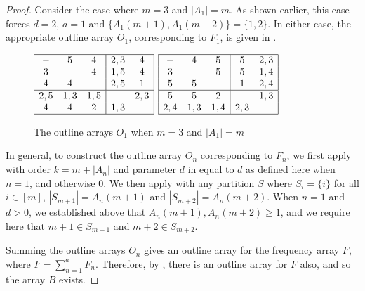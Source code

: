 \documentclass[preprint,nonatbib]{elsarticle}
\theoremstyle{definition}
\numberwithin{equation}{section}
\begin{document}
\begin{proof}
    Consider the case where $m=3$ and $|A_1| = m$. As shown earlier, this case forces $d=2$, $a=1$ and $\{A_1(m+1),A_1(m+2)\} = \{1,2\}$. In either case, the appropriate outline array $O_1$, corresponding to $F_1$, is given in .

    \begin{figure}[h]
        \centering
        $\begin{array}{|ccc|cc|}\hline
            - & 5 & 4 & 2,3 & 4 \\
            3 & - & 4 & 1,5 & 4 \\
            4 & 4 & - & 2,5 & 1 \\ \hline
            2,5 & 1,3 & 1,5 & - & 2,3 \\
            4 & 4 & 2 & 1,3 & - \\ \hline
        \end{array}$ \quad\quad\quad
        $\begin{array}{|ccc|cc|}\hline
            - & 4 & 5 & 5 & 2,3 \\
            3 & - & 5 & 5 & 1,4 \\
            5 & 5 & - & 1 & 2,4 \\ \hline
            5 & 5 & 2 & - & 1,3 \\
            2,4 & 1,3 & 1,4 & 2,3 & - \\ \hline
        \end{array}$
        \caption{The outline arrays $O_1$ when $m=3$ and $|A_1| = m$}
        \label{fig: $m=3$ case}
    \end{figure}
    
    In general, to construct the outline array $O_n$ corresponding to $F_n$, we first apply  with order $k = m + |A_n|$ and parameter $d$ in  equal to $d$ as defined here when $n=1$, and otherwise 0. We then apply  with any partition $S$ where $S_i = \{i\}$ for all $i\in[m]$, $|S_{m+1}| = A_n(m+1)$ and $|S_{m+2}| = A_n(m+2)$. When $n=1$ and $d>0$, we established above that $A_n(m+1),A_n(m+2)\geq 1$, and we require here that $m+1\in S_{m+1}$ and $m+2\in S_{m+2}$.
    
    
    Summing the outline arrays $O_n$ gives an outline array for the frequency array $F$, where $F = \sum_{n=1}^a F_n$. Therefore, by , there is an outline array for $F$ also, and so the array $B$ exists.
\end{proof}
\end{document}

